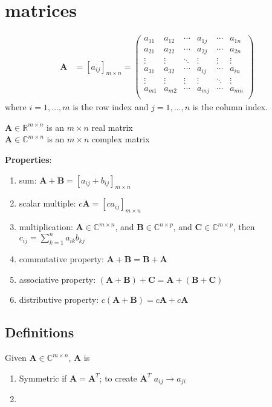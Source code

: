 \documentclass[12pt]{article}
\newcommand{\ve}[1]{\ensuremath{\mathbf{#1}}}
\begin{document}
\section{matrices}

\begin{align}
    \ve{A} &= [a_{ij}]_{m\times n}   =    \begin{pmatrix}
      a_{11} & a_{12} & \cdots & a_{1j} & \cdots & a_{1n} \\
      a_{21} & a_{22} & \cdots & a_{2j} & \cdots & a_{2n} \\
       \vdots & \vdots & \ddots & \vdots & \vdots   & \vdots \\     
      a_{31} & a_{32} & \cdots & a_{ij} & \cdots & a_{in} \\
      \vdots & \vdots & \vdots & \vdots & \ddots   & \vdots \\
      a_{m1} & a_{m2} & \cdots & a_{mj} & \cdots & a_{mn} \\
    \end{pmatrix} \nonumber   
\end{align} 
%
where $i = 1, \dots, m$ is the row index and $j = 1, \dots, n$ is the column index.

$\ve{A} \in \mathbb{R}^{m \times n}$ is an $m \times n$ real matrix\\
$\ve{A} \in \mathbb{C}^{m \times n}$ is an $m \times n$ complex matrix

\textbf{Properties}:
%
\begin{enumerate}
\item sum: $\ve{A} + \ve{B} = [a_{ij} + b_{ij}]_{m \times n}$
\item scalar multiple: $c\ve{A} = [c a_{ij}]_{m \times n}$
\item multiplication: $\ve{A} \in \mathbb{C}^{m \times n}$, and $\ve{B} \in \mathbb{C}^{n \times p}$, and $\ve{C} \in \mathbb{C}^{m \times p}$, then $c_{ij} = \sum_{k=1}^n a_{ik} b_{kj}$
\item commutative property: $\ve{A} + \ve{B} = \ve{B} + \ve{A}$
\item associative property: $(\ve{A} + \ve{B}) + \ve{C} = \ve{A} + (\ve{B} + \ve{C})$
\item distributive property: $c(\ve{A} + \ve{B}) = c\ve{A} + c\ve{A}$
\end{enumerate}


\subsection{Definitions}

Given $\ve{A} \in \mathbb{C}^{m \times n}$, \ve{A} is
%
\begin{enumerate}
\item Symmetric if $\ve{A} = \ve{A}^T$; to create $\ve{A}^T$ $a_{ij} \rightarrow a_{ji}$
\item 
\end{enumerate}
\end{document}
